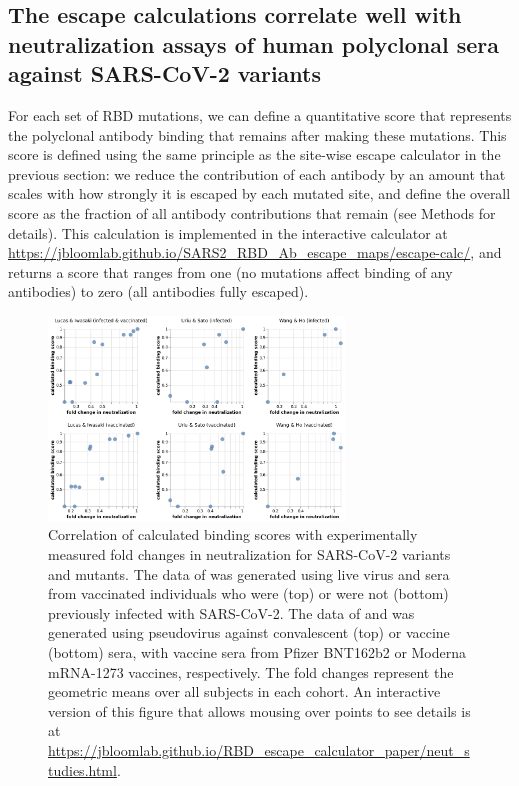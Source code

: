 \documentclass[9pt,twocolumn,twoside]{gsajnl_modified}
\begin{document}
\subsection{The escape calculations correlate well with neutralization assays of human polyclonal sera against SARS-CoV-2 variants}
For each set of RBD mutations, we can define a quantitative score that represents the polyclonal antibody binding that remains after making these mutations.
This score is defined using the same principle as the site-wise escape calculator in the previous section: we reduce the contribution of each antibody by an amount that scales with how strongly it is escaped by each mutated site, and define the overall score as the fraction of all antibody contributions that remain (see Methods for details).
This calculation is implemented in the interactive calculator at \url{https://jbloomlab.github.io/SARS2_RBD_Ab_escape_maps/escape-calc/}, and returns a score that ranges from one (no mutations affect binding of any antibodies) to zero (all antibodies fully escaped).

\begin{figure}
\includegraphics[width=0.7\textwidth]{../results/neut_studies/neut_studies.png}
\caption{Correlation of calculated binding scores with experimentally measured fold changes in neutralization for SARS-CoV-2 variants and mutants.
The data of \citet{lucas2021impact} was generated using live virus and sera from vaccinated individuals who were (top) or were not (bottom) previously infected with SARS-CoV-2.
The data of \citet{uriu2021neutralization} and \citet{wang2021antibody} was generated using pseudovirus against convalescent (top) or vaccine (bottom) sera, with vaccine sera from Pfizer BNT162b2 or Moderna mRNA-1273 vaccines, respectively. 
The fold changes represent the geometric means over all subjects in each cohort.
An interactive version of this figure that allows mousing over points to see details is at \url{https://jbloomlab.github.io/RBD_escape_calculator_paper/neut_studies.html}.
}
\label{fig:neut_studies}
\end{figure}
\end{document}
